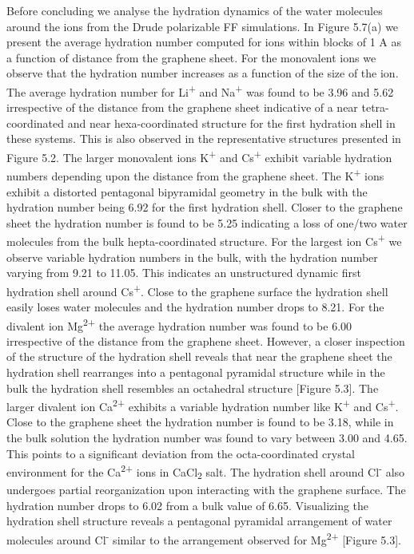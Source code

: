 Before concluding we analyse the hydration dynamics of the water molecules around the ions from the Drude polarizable FF simulations. In Figure 5.7(a) we present the average hydration number computed for ions within blocks of 1 A as a function of distance from the graphene sheet. For the monovalent ions we observe that the hydration number increases as a function of the size of the ion. The average hydration number for Li\textsuperscript{+} and Na\textsuperscript{+} was found to be 3.96 and 5.62 irrespective of the distance from the graphene sheet indicative of a near tetra-coordinated and near hexa-coordinated structure for the first hydration shell in these systems. This is also observed in the representative structures presented in Figure 5.2. The larger monovalent ions K\textsuperscript{+} and Cs\textsuperscript{+} exhibit variable hydration numbers depending upon the distance from the graphene sheet. The K\textsuperscript{+} ions exhibit a distorted pentagonal bipyramidal geometry in the bulk with the hydration number being 6.92 for the first hydration shell. Closer to the graphene sheet the hydration number is found to be 5.25 indicating a loss of one/two water molecules from the bulk hepta-coordinated structure. For the largest ion Cs\textsuperscript{+} we observe variable hydration numbers in the bulk, with the hydration number varying from 9.21 to 11.05. This indicates an unstructured dynamic first hydration shell around Cs\textsuperscript{+}. Close to the graphene surface the hydration shell easily loses water molecules and the hydration number drops to 8.21. For the divalent ion Mg\textsuperscript{2+} the average hydration number was found to be 6.00 irrespective of the distance from the graphene sheet. However, a closer inspection of the structure of the hydration shell reveals that near the graphene sheet the hydration shell rearranges into a pentagonal pyramidal structure while in the bulk the hydration shell resembles an octahedral structure [Figure 5.3]. The larger divalent ion Ca\textsuperscript{2+} exhibits a variable hydration number like K\textsuperscript{+} and Cs\textsuperscript{+}. Close to the graphene sheet the hydration number is found to be 3.18, while in the bulk solution the hydration number was found to vary between 3.00 and 4.65. This points to a significant deviation from the octa-coordinated crystal environment for the Ca\textsuperscript{2+} ions in CaCl\textsubscript{2} salt. The hydration shell around Cl\textsuperscript{-} also undergoes partial reorganization upon interacting with the graphene surface. The hydration number drops to 6.02 from a bulk value of 6.65. Visualizing the hydration shell structure reveals a pentagonal pyramidal arrangement of water molecules around Cl\textsuperscript{-} similar to the arrangement observed for Mg\textsuperscript{2+} [Figure 5.3].

